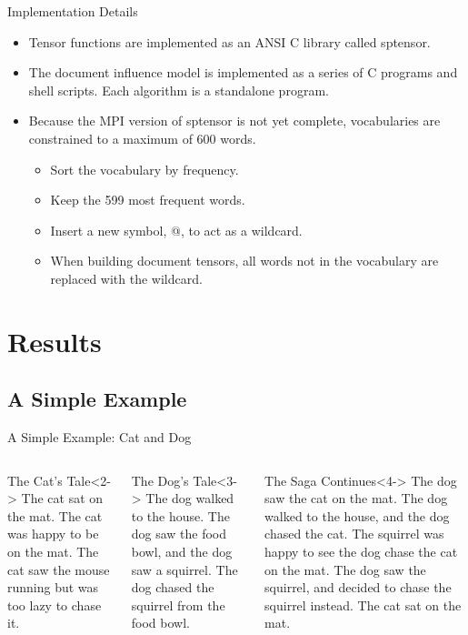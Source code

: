 \documentclass[handout]{beamer}
\begin{document}
\begin{frame}{Implementation Details}
  \begin{itemize}[<+->]
  \item Tensor functions are implemented as an ANSI C library called
    sptensor.
  \item The document influence model is implemented as a series of C
    programs and shell scripts.  Each algorithm is a standalone
    program.
  \item Because the MPI version of sptensor is not yet complete,
    vocabularies are constrained to a maximum of 600 words.
    \begin{itemize}[<+->]
    \item Sort the vocabulary by frequency.
    \item Keep the 599 most frequent words.
    \item Insert a new symbol, @, to act as a wildcard.
    \item When building document tensors, all words not in the
      vocabulary are replaced with the wildcard.
    \end{itemize}
  \end{itemize}
\end{frame}


\section{Results}
\subsection{A Simple Example}
\begin{frame}[t]{A Simple Example: Cat and Dog}
\begin{columns}[T]
  \begin{block}{The Cat's Tale}<2->
    \small
    The cat sat on the mat.  The cat was happy to be on the mat.  The
    cat saw the mouse running but was too lazy to chase it.
  \end{block}
  \begin{block}{The Dog's Tale}<3->
    \small
    The dog walked to the house.  The dog saw the food bowl, and the
    dog saw a squirrel.  The dog chased the squirrel from the food
    bowl.
  \end{block}
  \begin{block}{The Saga Continues}<4->
    \small
    The dog saw the cat on the mat.  The dog walked to the house, and
    the dog chased the cat.  The squirrel was happy to see the dog
    chase the cat on the mat.  The dog saw the squirrel, and decided
    to chase the squirrel instead.  The cat sat on the mat.
  \end{block}
\end{columns}
\end{frame}
\end{document}
